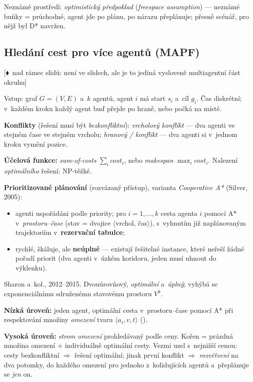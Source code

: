 \documentclass[11pt,a4paper]{article}
\theoremstyle{definition}
\newcommand{\mimoq}[1]{\textcolor{markcol}{\textsf{\footnotesize[$\blacklozenge$~nad rámec slidů: #1]}}}
\begin{document}
Neznámé prostředí: \emph{optimistický předpoklad} (\emph{freespace assumption}) --- neznámé
buňky = průchodné, agent jde po plánu, po nárazu přeplánuje; přesně scénář, pro nějž byl D*
navržen.

\subsection{Hledání cest pro více agentů (MAPF)}
\label{ssec:mapf}

\noindent\mimoq{není ve slidech, ale je to jediná vysloveně multiagentní část okruhu}

\begin{defbox}
Vstup: graf $G=(V,E)$ a~$k$ agentů, agent $i$ má start $s_i$ a~cíl $g_i$. Čas diskrétní;
v~každém kroku každý agent buď přejde po hraně, nebo počká na místě.

\textbf{Konflikty} (řešení musí být \emph{bezkonfliktní}): \emph{vrcholový konflikt} --- dva
agenti ve stejném čase ve stejném vrcholu; \emph{hranový /  konflikt} --- dva agenti
si v~jednom kroku vymění pozice.

\textbf{Účelová funkce:} \emph{sum-of-costs} $\sum_i \mathit{cost}_i$, nebo \emph{makespan}
$\max_i \mathit{cost}_i$. Nalezení \emph{optimálního} řešení: NP-těžké.
\end{defbox}

\textbf{Prioritizované plánování} (rozvázaný přístup), varianta \emph{Cooperative A*}
(Silver, 2005):
\begin{itemize}
\item agenti uspořádáni podle priority; pro $i = 1,\dots,k$ cesta agenta $i$ pomocí A*
  v~\emph{prostoru--čase} (stav = dvojice $\langle$vrchol, čas$\rangle$), s~vyhnutím již
  naplánovaným trajektoriím v~\textbf{rezervační tabulce};
\item rychlé, škáluje, ale \textbf{neúplné} --- existují řešitelné instance, které neřeší žádné
  pořadí priorit (dva agenti v~úzkém koridoru, jeden musí uhnout do výklenku).
\end{itemize}

\begin{defbox}
Sharon a~kol., 2012--2015. Dvouúrovňový, \emph{optimální} a~\emph{úplný}; vyhýbá se
exponenciálnímu sdruženému stavovému prostoru $V^k$.

\textbf{Nízká úroveň:} jeden agent, optimální cesta v~prostoru--čase pomocí A* při
respektování množiny \emph{omezení} tvaru $\langle a_i, v, t\rangle$ ().

\textbf{Vysoká úroveň:} \emph{strom omezení} prohledávaný podle ceny. Kořen = prázdná množina
omezení + individuálně optimální cesty. Vezmi uzel s~nejnižší cenou: cesty bezkonfliktní
$\Rightarrow$ řešení optimální; jinak první konflikt $\Rightarrow$ \emph{rozvětvení} na dva
potomky, do každého omezení pro jednoho z~kolidujících agentů a~přeplánuje se \emph{jen} on.
\end{defbox}
\end{document}

